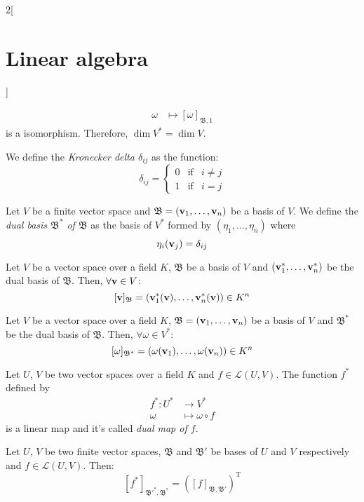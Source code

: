 \documentclass[../../../main.tex]{subfiles}
\begin{document}
\begin{multicols}{2}[\section{Linear algebra}]
\begin{prop}
\begin{align*}
            \omega & \longmapsto[\omega]_{\mathfrak{B},1}
        \end{align*}
        is a isomorphism. Therefore, $\dim V^*=\dim V$.
    \end{prop}
    \begin{definition}
        We define the \textit{Kronecker delta $\delta_{ij}$} as the function: $$\delta_{ij}=\left\{
            \begin{array}{ccc}
                0 & \text{if} & i\ne j \\
                1 & \text{if} & i=j
            \end{array}
            \right.$$
    \end{definition}
    \begin{definition}
        Let $V$ be a finite vector space and $\mathfrak{B}=(\boldsymbol{\mathrm{v}}_1,\ldots,\boldsymbol{\mathrm{v}}_n)$ be a basis of $V$. We define the \textit{dual basis $\mathfrak{B}^*$ of $\mathfrak{B}$} as the basis of $V^*$ formed by $(\eta_1,\ldots,\eta_n)$ where $$\eta_i(\boldsymbol{\mathrm{v}}_j)=\delta_{ij}$$
    \end{definition}
    \begin{lemma}
        Let $V$ be a vector space over a field $K$, $\mathfrak{B}$ be a basis of $V$ and $(\boldsymbol{\mathrm{v}}_1^*,\ldots,\boldsymbol{\mathrm{v}}_n^*)$ be the dual basis of $\mathfrak{B}$. Then, $\forall \boldsymbol{\mathrm{v}}\in V$: $$[\boldsymbol{\mathrm{v}}]_\mathfrak{B}=(\boldsymbol{\mathrm{v}}_1^*(\boldsymbol{\mathrm{v}}),\ldots,\boldsymbol{\mathrm{v}}_n^*(\boldsymbol{\mathrm{v}}))\in K^n$$
    \end{lemma}
    \begin{lemma}
        Let $V$ be a vector space over a field $K$, $\mathfrak{B}=(\boldsymbol{\mathrm{v}}_1,\ldots,\boldsymbol{\mathrm{v}}_n)$ be a basis of $V$ and $\mathfrak{B}^*$ be the dual basis of $\mathfrak{B}$. Then, $\forall \omega\in V^*$: $$[\omega]_{\mathfrak{B}^*}=(\omega(\boldsymbol{\mathrm{v}}_1),\ldots,\omega(\boldsymbol{\mathrm{v}}_n))\in K^n$$
    \end{lemma}
    \begin{definition}
        Let $U$, $V$ be two vector spaces over a field $K$ and $f\in \mathcal{L}(U,V)$. The function $f^*$ defined by
        \begin{align*}
            f^*:U^* & \longrightarrow V^*      \\
            \omega  & \longmapsto\omega\circ f
        \end{align*}
        is a linear map and it's called \textit{dual map of $f$}.
    \end{definition}
    \begin{theorem}
        Let $U$, $V$ be two finite vector spaces, $\mathfrak{B}$ and $\mathfrak{B}'$ be bases of $U$ and $V$ respectively and $f\in\mathcal{L}(U,V)$. Then: $$[f^*]_{\mathfrak{B}'^*,\mathfrak{B}^*}={([f]_{\mathfrak{B},\mathfrak{B}'})}^\mathrm{T}$$
    \end{theorem}

\end{multicols}
\end{document}
